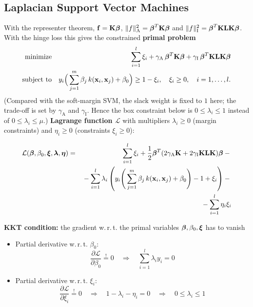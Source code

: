 \subsection{Laplacian Support Vector Machines}\label{sec:lapsvm}
With the representer theorem, $\bm{\mathrm{f}}=\mathbf{K}\bm{\mathrm{\beta}}$, $\|f\|_\text{A}^2=\bm{\mathrm{\beta}}^T\mathbf{K}\bm{\mathrm{\beta}}$ and $\|f\|_\text{I}^2=\bm{\mathrm{\beta}}^T\mathbf{K}\mathbf{L}\mathbf{K}\bm{\mathrm{\beta}}$. With the hinge loss this gives the constrained \textbf{primal problem}
  \begin{eqnarray*}
    \mbox{minimize}   & & \sum_{i=1}^l \xi_i + \gamma_\text{A}\,\bm{\mathrm{\beta}}^T\mathbf{K}\bm{\mathrm{\beta}} + \gamma_\text{I}\,\bm{\mathrm{\beta}}^T\mathbf{K}\mathbf{L}\mathbf{K}\bm{\mathrm{\beta}}\\
    \mbox{subject to} & & y_i\Big(\sum_{j=1}^m \beta_j\, k(\bm{\mathrm{x}}_i,\bm{\mathrm{x}}_j)+\beta_0\Big)\ge 1-\xi_i,\quad \xi_i\ge 0,\quad i=1,\dots,l.
  \end{eqnarray*}
  (Compared with the soft-margin SVM, the slack weight is fixed to $1$ here; the trade-off is set by $\gamma_\text{A}$ and $\gamma_\text{I}$. Hence the box constraint below is $0\le\lambda_i\le1$ instead of $0\le\lambda_i\le\mu$.)
\textbf{Lagrange function $\mathcal L$} with multipliers $\lambda_i\ge0$ (margin constraints) and $\eta_i\ge0$ (constraints $\xi_i\ge0$):
  
  \begin{eqnarray*}
    \mathcal L(\bm{\mathrm{\beta}},\beta_0,\bm{\mathrm{\xi}},\bm{\mathrm{\lambda}},\bm{\mathrm{\eta}}) 
    &=& \sum_{i=1}^l \xi_i +
        \frac{1}{2} \bm{\mathrm{\beta}}^T (2 \gamma_\text{A} \mathbf{K} + 2 \gamma_\text{I} \mathbf{K}\mathbf{L}\mathbf{K}) \bm{\mathrm{\beta}} -{} \\
    & & {}- \sum_{i=1}^l \lambda_i \left(y_i \Bigg(\sum_{j=1}^m \beta_j \, k(\bm{\mathrm{x}}_i,\bm{\mathrm{x}}_j) + \beta_0\Bigg) - 1 + \xi_i\right) -{} \\
    & & {}- \sum_{i=1}^l \eta_i \xi_i
  \end{eqnarray*}
     
    \textbf{KKT condition:} the gradient w.\,r.\,t. the primal variables $\bm{\mathrm{\beta}}, \beta_0, \bm{\mathrm{\xi}}$ has to vanish
   
  
  \begin{itemize}
    \item Partial derivative w.\,r.\,t. $\beta_0$:
      \begin{displaymath}
        \frac{\partial \mathcal L}{\partial \beta_0} \stackrel{!}{=} 0  \quad \Rightarrow \quad
        \sum_{i=1}^l \lambda_i y_i = 0
      \end{displaymath}
       
    \item Partial derivative w.\,r.\,t. $\xi_i$:
      \begin{displaymath}
        \frac{\partial \mathcal L}{\partial \xi_i} \stackrel{!}{=} 0  \quad \Rightarrow \quad
        1 - \lambda_i - \eta_i = 0 \quad \Rightarrow \quad
        0 \leq \lambda_i \leq 1
      \end{displaymath}
  \end{itemize}
  
